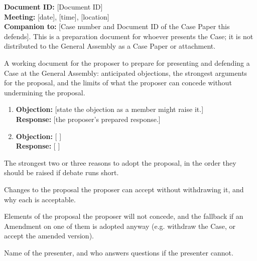 \documentclass{../../Common/Latex/Templates/rapport}
\newcommand{\meetingline}{\textbf{Meeting:} [date], [time], [location]}
\begin{document}
\reportmainmatter

\noindent\textbf{Document ID:} [Document ID]\\
\meetingline\\
\textbf{Companion to:} [Case number and Document ID of the Case Paper this defends]. This is a preparation document for whoever presents the Case; it is not distributed to the General Assembly as a Case Paper or attachment.

A working document for the proposer to prepare for presenting and defending a Case at the General Assembly: anticipated objections, the strongest arguments for the proposal, and the limits of what the proposer can concede without undermining the proposal.

\begin{enumerate}[label=\arabic*.]
  \item \textbf{Objection:} [state the objection as a member might raise it.]\\
        \textbf{Response:} [the proposer's prepared response.]
  \item \textbf{Objection:} [ ]\\
        \textbf{Response:} [ ]
\end{enumerate}

The strongest two or three reasons to adopt the proposal, in the order they should be raised if debate runs short.

Changes to the proposal the proposer can accept without withdrawing it, and why each is acceptable.

Elements of the proposal the proposer will not concede, and the fallback if an Amendment on one of them is adopted anyway (e.g. withdraw the Case, or accept the amended version).

Name of the presenter, and who answers questions if the presenter cannot.
\end{document}
